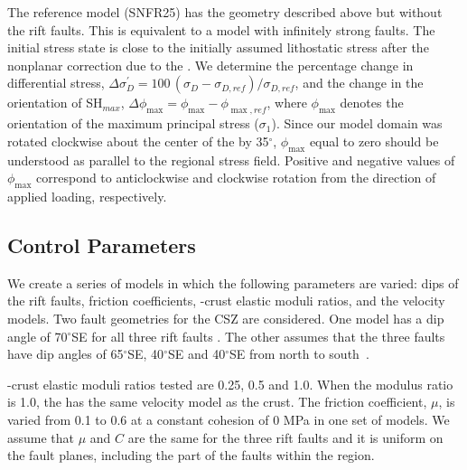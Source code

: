 \documentclass[draft]{agujournal2018}
\begin{document}
The reference model (SNFR25) has the geometry described above but without the rift faults. This is equivalent to a model with infinitely strong faults. The initial stress state is close to the initially assumed lithostatic stress after the nonplanar correction due to the . We determine the percentage change in differential stress, $\Delta\sigma_{D}^{\prime}=100\,( \sigma_{D}-\sigma_{D,ref}) / \sigma_{D,ref}$, and the change in the orientation of SH$_{max}$,  $\Delta\phi_{\max}=\phi_{\max}-\phi_{\max,ref}$, where $\phi_{\max}$ denotes the orientation of the maximum principal stress ($\sigma_1$). Since our model domain was rotated clockwise about the center of the  by 35$^\circ$, $\phi_{\max}$ equal to zero should be understood as parallel to the regional stress field. Positive and negative values of $\phi_{\max}$ correspond to anticlockwise and clockwise rotation from the direction of applied loading, respectively. 


\subsection{Control Parameters}
We create a series of models in which the following parameters are varied: dips of the rift faults, friction coefficients, -crust elastic moduli ratios, and the velocity models. Two fault geometries for the CSZ are considered. One model has a dip angle of 70$^\circ$SE for all three rift faults \citep{Baird_2010}. The other assumes that the three faults have dip angles of 65$^\circ$SE, 40$^\circ$SE and 40$^\circ$SE from north to south~\citep{Powell_2017}.

-crust elastic moduli ratios tested are 0.25, 0.5 and 1.0. When the modulus ratio is 1.0, the  has the same velocity model as the crust. The friction coefficient, $\mu$, is varied from 0.1 to 0.6 at a constant cohesion of 0 MPa in one set of models. We assume that $\mu$ and $C$ are the same for the three rift faults and it is uniform on the fault planes, including the part of the faults within the  region. 
\end{document}
